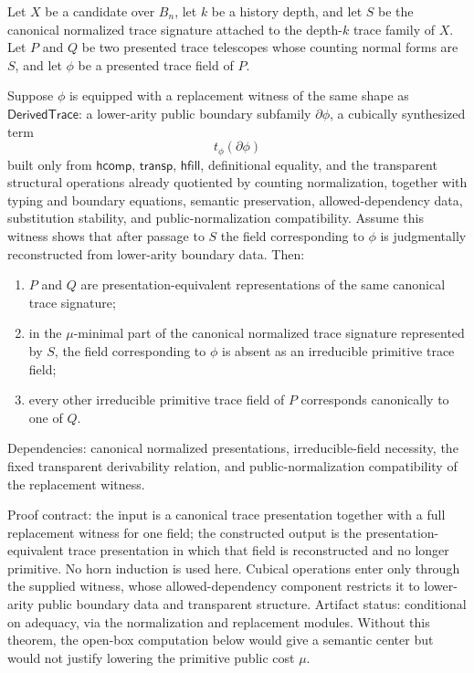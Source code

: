 \documentclass{lmcs}
\begin{document}
\begin{thm}
Let \(X\) be a candidate over \(B_n\), let \(k\) be a history depth, and let \(S\) be the
canonical normalized trace signature attached to the depth-\(k\) trace family of \(X\).  Let
\(P\) and \(Q\) be two presented trace telescopes whose counting normal forms are \(S\), and
let \(\phi\) be a presented trace field of \(P\).

Suppose \(\phi\) is equipped with a replacement witness of the same shape as
\(\mathsf{DerivedTrace}\): a lower-arity public boundary subfamily \(\partial\phi\), a
cubically synthesized term
\[
  t_\phi(\partial\phi)
\]
built only from \(\mathsf{hcomp}\), \(\mathsf{transp}\), \(\mathsf{hfill}\), definitional
equality, and the transparent structural operations already quotiented by counting
normalization, together with typing and boundary equations, semantic preservation,
allowed-dependency data, substitution stability, and public-normalization compatibility.
Assume this witness shows that after passage to \(S\) the field corresponding to \(\phi\) is
judgmentally reconstructed from lower-arity boundary data.  Then:
\begin{enumerate}
\item \(P\) and \(Q\) are presentation-equivalent representations of the same canonical trace
signature;
\item in the \(\mu\)-minimal part of the canonical normalized trace signature represented by
\(S\), the field corresponding to \(\phi\) is absent as an irreducible primitive trace field;
\item every other irreducible primitive trace field of \(P\) corresponds canonically to one of
\(Q\).
\end{enumerate}

Dependencies: canonical normalized presentations, irreducible-field necessity, the fixed
transparent derivability relation, and public-normalization compatibility of the replacement
witness.

Proof contract: the input is a canonical trace presentation together with a full
replacement witness for one field; the constructed output is the
presentation-equivalent trace presentation in which that field is reconstructed
and no longer primitive.  No horn induction is used here.  Cubical operations
enter only through the supplied witness, whose allowed-dependency component
restricts it to lower-arity public boundary data and transparent structure.
Artifact status: conditional on adequacy, via the normalization and replacement
modules.  Without this theorem, the open-box computation below would give a
semantic center but would not justify lowering the primitive public cost
\(\mu\).
\end{thm}
\end{document}
